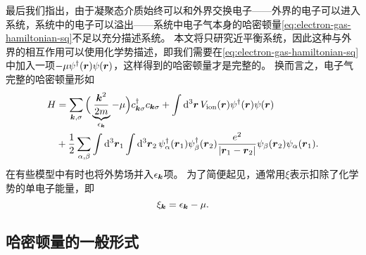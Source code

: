 最后我们指出，由于凝聚态介质始终可以和外界交换电子——外界的电子可以进入系统，系统中的电子可以溢出——系统中电子气本身的哈密顿量\eqref{eq:electron-gas-hamiltonian-sq}不足以充分描述系统。
本文将只研究近平衡系统，因此这种与外界的相互作用可以使用化学势描述，即我们需要在\eqref{eq:electron-gas-hamiltonian-sq}中加入一项$-\mu {\psi}^\dagger(\vb*{r}) {\psi}(\vb*{r})$，这样得到的哈密顿量才是完整的。
换而言之，电子气完整的哈密顿量形如
\begin{equation}
    \begin{aligned}
        {H} &= \sum_{\vb*{k}, \sigma} \Big( \underbrace{\frac{\vb*{k}^2}{2m}}_{\epsilon_{\vb*{k}}} - \mu \Big) {c}^\dagger_{\vb*{k} \sigma} {c}_{\vb*{k} \sigma} 
        + \int \dd[3]{\vb*{r}} V_\text{ion}(\vb*{r}) {\psi}^\dagger(\vb*{r}) {\psi}(\vb*{r}) \\ 
        &+ \frac{1}{2} \sum_{\alpha, \beta} \int \dd[3]{\vb*{r}_1} \int \dd[3]{\vb*{r}_2} 
        {\psi}_\alpha^\dagger (\vb*{r}_1) {\psi}_\beta^\dagger (\vb*{r}_2) \frac{e^2}{\abs{\vb*{r}_1 - \vb*{r}_2}} {\psi}_\beta (\vb*{r}_2) {\psi}_\alpha (\vb*{r}_1).
    \end{aligned}
    \label{eq:full-electron-gas-hamiltonian}
\end{equation}
在有些模型中有时也将外势场并入$\epsilon_{\vb*{k}}$项。
为了简便起见，通常用$\xi$表示扣除了化学势的单电子能量，即
\begin{equation}
    \xi_{\vb*{k}} = \epsilon_{\vb*{k}} - \mu.
\end{equation}

\subsection{哈密顿量的一般形式}

